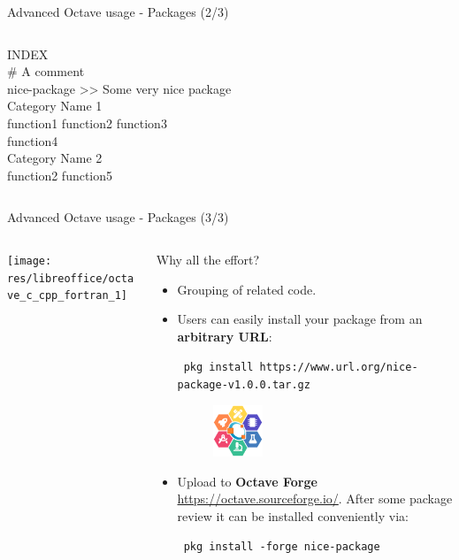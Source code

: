 \begin{frame}{Advanced Octave usage - Packages (2/3)}
\begin{columns}
\begin{column}{0.5\textwidth}
\colorbox{red!30}{INDEX} \\[0.5em]
\# A comment \\
nice-package >$ $> Some very nice package \\
Category Name 1 \\
 function1 function2 function3 \\
 function4 \\
Category Name 2 \\
 function2 function5 \\
\end{column}
\end{columns}
\end{frame}


\begin{frame}{Advanced Octave usage - Packages (3/3)}
\begin{columns}
\begin{column}[t]{0.2\textwidth}
\texttt{[image: res/libreoffice/octave\_c\_cpp\_fortran\_1]}
\end{column}
\begin{column}{0.75\textwidth}
\small
Why all the effort?
\begin{itemize}
\itemsep1em
\item
Grouping of related code.

\item
Users can easily install your package from an \textbf{arbitrary URL}:

\texttt{\scriptsize\color{DarkBlue}
pkg install https://www.url.org/nice-package-v1.0.0.tar.gz}

\begin{figure}
\includegraphics[width=4em]{res/images/octave-flower}
\end{figure}

\item
Upload to \textbf{Octave Forge} \url{https://octave.sourceforge.io/}.
After some package review it can be installed conveniently via:

\texttt{\footnotesize\color{DarkBlue}
pkg install {\color{red!50!black}-forge} nice-package}

\end{itemize}
\end{column}
\end{columns}
\end{frame}
